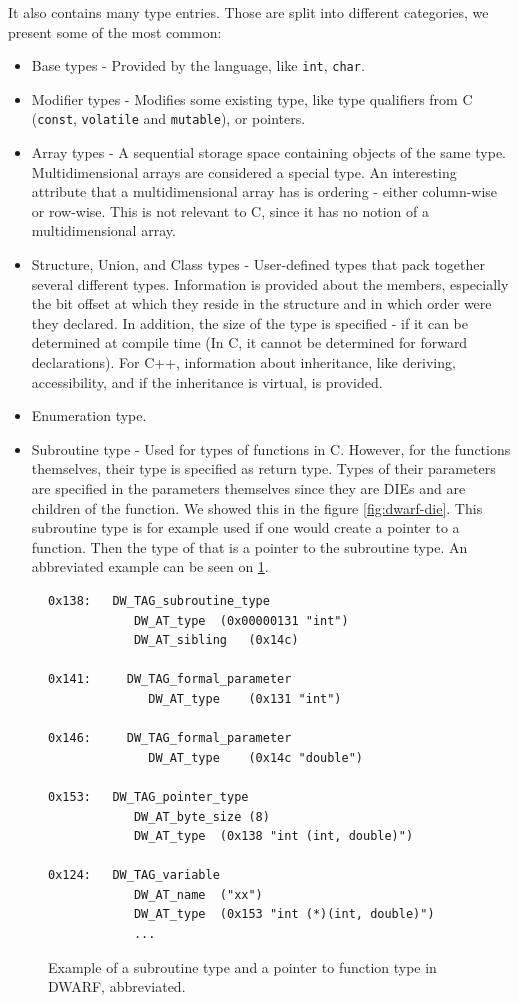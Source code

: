 It also contains many type entries.
Those are split into different categories, we present some of the most common:
\begin{itemize}
    \item Base types - Provided by the language, like \texttt{int},
        \texttt{char}.
    \item Modifier types - Modifies some existing type, like type qualifiers
        from C (\texttt{const}, \texttt{volatile} and \texttt{mutable}), or
        pointers.
    \item Array types - A sequential storage space containing objects of the
        same type. Multidimensional arrays are considered a special type.
        An interesting attribute that a multidimensional array has is ordering -
        either column-wise or row-wise. This is not relevant to C, since it has no
        notion of a multidimensional array.
    \item Structure, Union, and Class types - User-defined types that pack
        together several different types. Information is provided about the
        members, especially the bit offset at which they reside in the structure
        and in which order were they declared. In addition, the size of the type
        is specified - if it can be determined at compile time (In C, it cannot
        be determined for forward declarations). For C++, information about
        inheritance, like deriving, accessibility, and if the inheritance is
        virtual, is provided.
    \item Enumeration type.
    \item Subroutine type - Used for types of functions in C. However, for the
        functions themselves, their type is specified as return type. Types of
        their parameters are specified in the parameters themselves since they
        are DIEs and are children of the function. We showed this in the figure
        \ref{fig:dwarf-die}. This subroutine type is for example used if one
        would create a pointer to a function. Then the type of that is a pointer
        to the subroutine type. An abbreviated example can be seen on
        \ref{fig:dwarf-ptr-to-fun}.
\end{itemize}

\begin{figure}
    \begin{lstlisting}
0x138:   DW_TAG_subroutine_type
            DW_AT_type	(0x00000131 "int")
            DW_AT_sibling	(0x14c)

0x141:     DW_TAG_formal_parameter
              DW_AT_type	(0x131 "int")

0x146:     DW_TAG_formal_parameter
              DW_AT_type	(0x14c "double")

0x153:   DW_TAG_pointer_type
            DW_AT_byte_size	(8)
            DW_AT_type	(0x138 "int (int, double)")

0x124:   DW_TAG_variable
            DW_AT_name	("xx")
            DW_AT_type	(0x153 "int (*)(int, double)")
            ...
    \end{lstlisting}
    \caption{Example of a subroutine type and a pointer to function type in
    DWARF, abbreviated.}
    \label{fig:dwarf-ptr-to-fun}
\end{figure}

